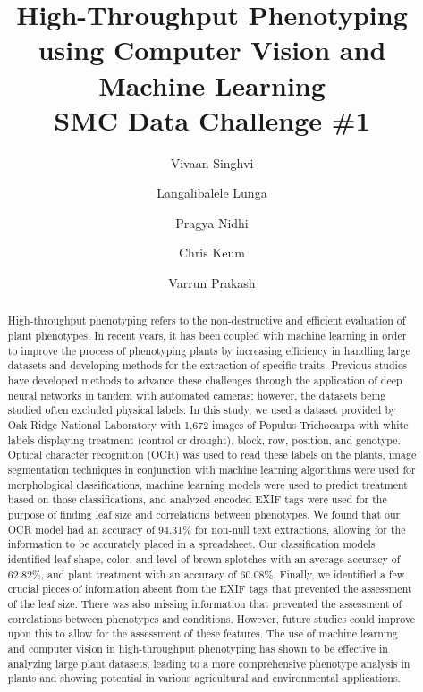 \documentclass[final,5p,times,twocolumn,authoryear]{elsarticle}
\begin{document}
\renewcommand*{\today}{July 28, 2023}

\begin{frontmatter}

\title{
High-Throughput Phenotyping using Computer Vision and Machine Learning \\
\large SMC Data Challenge \#1
}

\author[fhs]{Vivaan Singhvi}
\author[fhs]{Langalibalele Lunga}
\author[fhs]{Pragya Nidhi}
\author[fhs]{Chris Keum}
\author[fhs]{Varrun Prakash}


\begin{abstract}
High-throughput phenotyping refers to the non-destructive and efficient evaluation of plant phenotypes. In recent years, it has been coupled with machine learning in order to improve the process of phenotyping plants by increasing efficiency in handling large datasets and developing methods for the extraction of specific traits. Previous studies have developed methods to advance these challenges through the application of deep neural networks in tandem with automated cameras; however, the datasets being studied often excluded physical labels. In this study, we used a dataset provided by Oak Ridge National Laboratory with 1,672 images of Populus Trichocarpa with white labels displaying treatment (control or drought), block, row, position, and genotype. Optical character recognition (OCR) was used to read these labels on the plants, image segmentation techniques in conjunction with machine learning algorithms were used for morphological classifications, machine learning models were used to predict treatment based on those classifications, and analyzed encoded EXIF tags were used for the purpose of finding leaf size and correlations between phenotypes. We found that our OCR model had an accuracy of 94.31\% for non-null text extractions, allowing for the information to be accurately placed in a spreadsheet. Our classification models identified leaf shape, color, and level of brown splotches with an average accuracy of 62.82\%, and plant treatment with an accuracy of 60.08\%. Finally, we identified a few crucial pieces of information absent from the EXIF tags that prevented the assessment of the leaf size. There was also missing information that prevented the assessment of correlations between phenotypes and conditions. However, future studies could improve upon this to allow for the assessment of these features. The use of machine learning and computer vision in high-throughput phenotyping has shown to be effective in analyzing large plant datasets, leading to a more comprehensive phenotype analysis in plants and showing potential in various agricultural and environmental applications.
\end{abstract}


\end{frontmatter}
\end{document}
